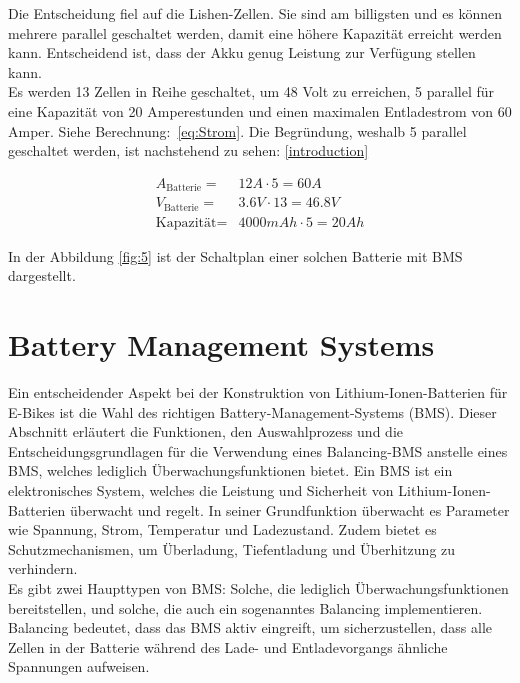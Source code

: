 Die Entscheidung fiel auf die Lishen-Zellen.
Sie sind am billigsten und es können mehrere parallel geschaltet werden, damit eine höhere Kapazität erreicht werden kann.
Entscheidend ist, dass der Akku genug Leistung zur Verfügung stellen kann.\\

Es werden 13 Zellen in Reihe geschaltet, um 48 Volt zu erreichen, 5 parallel für eine Kapazität von 20 Amperestunden und einen maximalen Entladestrom von 60 Amper.
Siehe Berechnung:~\ref{eq:Strom}.
Die Begründung, weshalb 5 parallel geschaltet werden, ist nachstehend zu sehen: \ref{introduction}

\begin{align}
    A_{\textrm{Batterie}} =& 12 A\cdot 5 = 60 A\\
    V_{\textrm{Batterie}} =& 3.6V \cdot 13 = 46.8V\\
    \textrm{Kapazität} =& 4000mAh \cdot 5 = 20 Ah
    \label{eq:Strom}
\end{align}

In der Abbildung \ref{fig:5} ist der Schaltplan einer solchen Batterie mit BMS dargestellt.





\section{Battery Management Systems}
Ein entscheidender Aspekt bei der Konstruktion von Lithium-Ionen-Batterien für E-Bikes ist die Wahl des richtigen Battery-Management-Systems (BMS). Dieser Abschnitt erläutert die Funktionen, den Auswahlprozess und die Entscheidungsgrundlagen für die Verwendung eines Balancing-BMS anstelle eines BMS, welches lediglich Überwachungsfunktionen bietet.
Ein BMS ist ein elektronisches System, welches die Leistung und Sicherheit von Lithium-Ionen-Batterien überwacht und regelt.
In seiner Grundfunktion überwacht es Parameter wie Spannung,
Strom, Temperatur und Ladezustand.
Zudem bietet es Schutzmechanismen, um Überladung, Tiefentladung und Überhitzung zu verhindern.\\
Es gibt zwei Haupttypen von BMS: Solche, die lediglich Überwachungsfunktionen bereitstellen, und solche, die auch ein sogenanntes Balancing implementieren.
Balancing bedeutet, dass das BMS aktiv eingreift, um sicherzustellen, dass alle Zellen in der Batterie während des Lade- und Entladevorgangs ähnliche Spannungen aufweisen.\\

